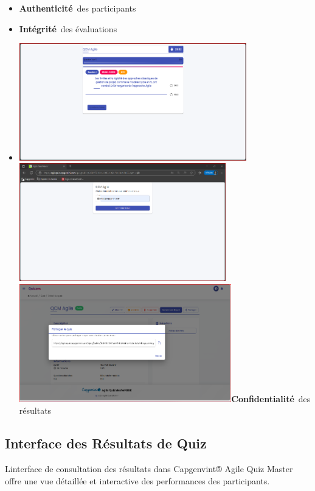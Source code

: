 \documentclass[12pt,a4paper,twoside,openright]{report}
\begin{document}
\begin{itemize}
\item
  \textbf{Authenticité}~des participants
\item
  \textbf{Intégrité}~des évaluations
\item
  \includegraphics[width=3.88264in,height=2.00556in]{latex_media/media/image61.png}\includegraphics[width=3.53125in,height=2.01806in]{latex_media/media/image62.png}\includegraphics[width=3.62986in,height=2.02292in]{latex_media/media/image63.png}\textbf{Confidentialité}~des
  résultats
\end{itemize}

\hypertarget{interface-des-ruxe9sultats-de-quiz}{%
\subsection{Interface des Résultats de
Quiz}\label{interface-des-ruxe9sultats-de-quiz}}

L\textquotesingle interface de consultation des résultats dans
Capgenvint® Agile Quiz Master offre une vue détaillée et interactive des
performances des participants.
\end{document}
